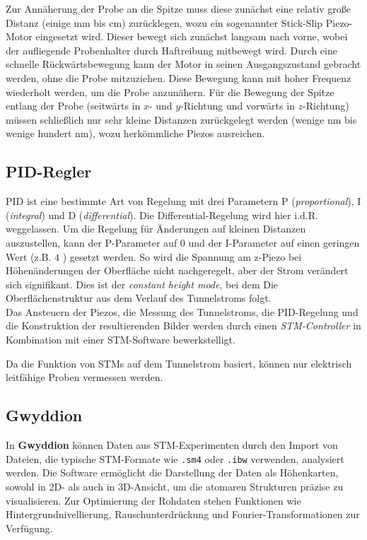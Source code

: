 \documentclass{article}
\begin{document}
Zur Annäherung der Probe an die Spitze muss diese zunächst eine relativ 
große Distanz (einige \si{\mm} bis \si{cm}) zurücklegen, wozu ein sogenannter Stick-Slip
Piezo-Motor eingesetzt wird. Dieser bewegt sich zunächst langsam nach vorne, wobei
der aufliegende Probenhalter durch Haftreibung mitbewegt wird. Durch eine schnelle
Rückwärtsbewegung kann der Motor in seinen Ausgangszustand gebracht werden, ohne die
Probe mitzuziehen. Diese Bewegung kann mit hoher Frequenz wiederholt werden, um die Probe anzunähern.
Für die Bewegung der Spitze entlang der Probe (seitwärts in $x$- und $y$-Richtung und
vorwärts in $z$-Richtung) müssen schließlich nur sehr kleine Distanzen zurückgelegt
werden (wenige \si{nm} bis wenige hundert \si{\nm}), wozu herkömmliche Piezos ausreichen.

\subsection*{PID-Regler}
PID ist eine bestimmte Art von Regelung mit drei Parametern P (\textit{proportional}), I (\textit{integral}) und D (\textit{differential}).
Die Differential-Regelung wird hier i.d.R. weggelassen. Um die Regelung für Änderungen auf kleinen Distanzen auszustellen, kann der P-Parameter auf $0$ und
der I-Parameter auf einen geringen Wert (z.B. $4$ \cite{Anleitung}) gesetzt werden.
So wird die Spannung am z-Piezo bei Höhenänderungen der Oberfläche nicht nachgeregelt,
aber der Strom verändert sich signifikant. Dies ist der \textit{constant height mode},
bei dem Die Oberflächenstruktur aus dem Verlauf des Tunnelstroms folgt.\\

Das Ansteuern der Piezos, die Messung des Tunnelstroms, die PID-Regelung und die Konstruktion der resultierenden Bilder werden
durch einen \textit{STM-Controller} in Kombination mit einer STM-Software bewerkstelligt.

Da die Funktion von STMs auf dem Tunnelstrom basiert, können nur elektrisch leitfähige
Proben vermessen werden. 

\subsection*{Gwyddion} 
In \textbf{Gwyddion} können Daten aus STM-Experimenten durch den Import von Dateien, die typische STM-Formate wie \texttt{.sm4} oder \texttt{.ibw} verwenden, analysiert werden. Die Software ermöglicht die Darstellung der Daten als Höhenkarten, sowohl in 2D- als auch in 3D-Ansicht, um die atomaren Strukturen präzise zu visualisieren. Zur Optimierung der Rohdaten stehen Funktionen wie Hintergrundnivellierung, Rauschunterdrückung und Fourier-Transformationen zur Verfügung.
\end{document}
